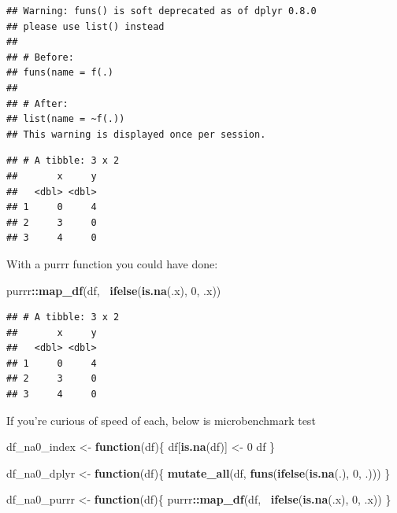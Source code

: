 \documentclass[]{book}
\newenvironment{Shaded}{\begin{snugshade}}{\end{snugshade}}
\newcommand{\ControlFlowTok}[1]{\textcolor[rgb]{0.13,0.29,0.53}{\textbf{#1}}}
\newcommand{\DecValTok}[1]{\textcolor[rgb]{0.00,0.00,0.81}{#1}}
\newcommand{\KeywordTok}[1]{\textcolor[rgb]{0.13,0.29,0.53}{\textbf{#1}}}
\newcommand{\NormalTok}[1]{#1}
\newcommand{\OperatorTok}[1]{\textcolor[rgb]{0.81,0.36,0.00}{\textbf{#1}}}
\newcommand{\StringTok}[1]{\textcolor[rgb]{0.31,0.60,0.02}{#1}}
\theoremstyle{definition}
\theoremstyle{definition}
\theoremstyle{definition}
\theoremstyle{remark}
\begin{document}
\begin{verbatim}
## Warning: funs() is soft deprecated as of dplyr 0.8.0
## please use list() instead
## 
## # Before:
## funs(name = f(.)
## 
## # After: 
## list(name = ~f(.))
## This warning is displayed once per session.
\end{verbatim}

\begin{verbatim}
## # A tibble: 3 x 2
##       x     y
##   <dbl> <dbl>
## 1     0     4
## 2     3     0
## 3     4     0
\end{verbatim}

With a purrr function you could have done:

\begin{Shaded}
\begin{Highlighting}[]
\NormalTok{purrr}\OperatorTok{::}\KeywordTok{map_df}\NormalTok{(df, }\OperatorTok{~}\KeywordTok{ifelse}\NormalTok{(}\KeywordTok{is.na}\NormalTok{(.x), }\DecValTok{0}\NormalTok{, .x))}
\end{Highlighting}
\end{Shaded}

\begin{verbatim}
## # A tibble: 3 x 2
##       x     y
##   <dbl> <dbl>
## 1     0     4
## 2     3     0
## 3     4     0
\end{verbatim}

If you're curious of speed of each, below is microbenchmark test

\begin{Shaded}
\begin{Highlighting}[]
\NormalTok{df_na0_index <-}\StringTok{ }\ControlFlowTok{function}\NormalTok{(df)\{}
\NormalTok{  df[}\KeywordTok{is.na}\NormalTok{(df)] <-}\StringTok{ }\DecValTok{0}
\NormalTok{  df}
\NormalTok{\}}

\NormalTok{df_na0_dplyr <-}\StringTok{ }\ControlFlowTok{function}\NormalTok{(df)\{}
  \KeywordTok{mutate_all}\NormalTok{(df, }\KeywordTok{funs}\NormalTok{(}\KeywordTok{ifelse}\NormalTok{(}\KeywordTok{is.na}\NormalTok{(.), }\DecValTok{0}\NormalTok{, .)))}
\NormalTok{\}}

\NormalTok{df_na0_purrr <-}\StringTok{ }\ControlFlowTok{function}\NormalTok{(df)\{}
\NormalTok{  purrr}\OperatorTok{::}\KeywordTok{map_df}\NormalTok{(df, }\OperatorTok{~}\KeywordTok{ifelse}\NormalTok{(}\KeywordTok{is.na}\NormalTok{(.x), }\DecValTok{0}\NormalTok{, .x))}
\NormalTok{\}}
\end{Highlighting}
\end{Shaded}
\end{document}
